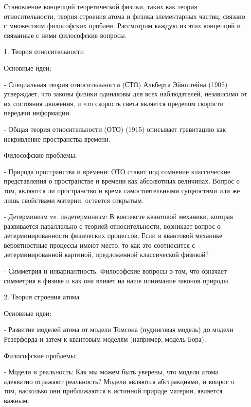 \documentclass[exam_answers.tex]{subfiles}
\begin{document}
\renewcommand{\baselinestretch}{\blch}

Становление концепций теоретической физики, таких как теория относительности, теория строения атома и физика элементарных частиц, связано с множеством философских проблем.
Рассмотрим каждую из этих концепций и связанные с ними философские вопросы.

1. Теория относительности

Основные идеи:

- Специальная теория относительности (СТО) Альберта Эйнштейна (1905) утверждает, что законы физики одинаковы для всех наблюдателей, независимо от их состояния движения, и что скорость света является пределом скорости передачи информации.

- Общая теория относительности (ОТО) (1915) описывает гравитацию как искривление пространства-времени.

Философские проблемы:

- Природа пространства и времени: ОТО ставит под сомнение классические представления о пространстве и времени как абсолютных величинах. Вопрос о том, являются ли пространство и время самостоятельными сущностями или же лишь свойствами материи, остается открытым.

- Детерминизм vs. индетерминизм: В контексте квантовой механики, которая развивается параллельно с теорией относительности, возникает вопрос о детерминированности физических процессов.
Если в квантовой механике вероятностные процессы имеют место, то как это соотносится с детерминированной картиной, предложенной классической физикой?

- Симметрия и инвариантность: Философские вопросы о том, что означает симметрия в физике и как она влияет на наше понимание законов природы.

2. Теория строения атома

Основные идеи:

- Развитие моделей атома от модели Томсона (пудинговая модель) до модели Резерфорда и затем к квантовым моделям (например, модель Бора).

Философские проблемы:

- Модели и реальность: Как мы можем быть уверены, что модели атома адекватно отражают реальность? Модели являются абстракциями, и вопрос о том, насколько они приближаются к истинной природе материи, является важным.
\end{document}
